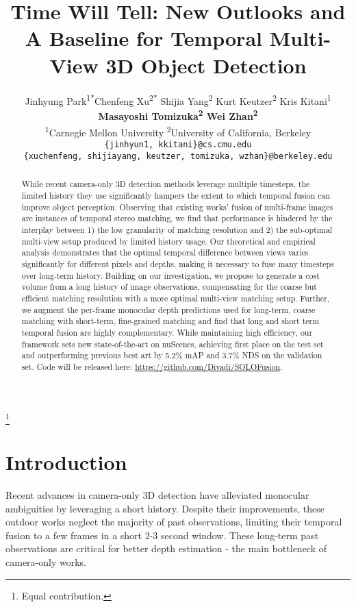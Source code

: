 \documentclass[runningheads, hyperfootnotes=false]{article}
\title{Time Will Tell: New Outlooks and A Baseline for Temporal Multi-View 3D Object Detection}
\author{Jinhyung Park\textsuperscript{1}\textsuperscript{*}\quad Chenfeng Xu\textsuperscript{2}\textsuperscript{*} \quad Shijia Yang\textsuperscript{2} \quad Kurt Keutzer\textsuperscript{2} \quad Kris Kitani\textsuperscript{1} \\ \textbf{Masayoshi Tomizuka\textsuperscript{2} \quad Wei Zhan\textsuperscript{2}}\\
\textsuperscript{1}Carnegie Mellon University \quad \textsuperscript{2}University of California, Berkeley
\\
\texttt{\{jinhyun1, kkitani\}@cs.cmu.edu} \\
\texttt{\{xuchenfeng, shijiayang, keutzer, tomizuka, wzhan\}@berkeley.edu}
}
\begin{document}
\maketitle
\let\thefootnote\relax\footnote{{Equal contribution.}}

\begin{abstract}
While recent camera-only 3D detection methods leverage multiple timesteps, the limited history they use significantly hampers the extent to which temporal fusion can improve object perception. Observing that existing works' fusion of multi-frame images are instances of temporal stereo matching, we find that performance is hindered by the interplay between 1) the low granularity of matching resolution and 2) the sub-optimal multi-view setup produced by limited history usage. Our theoretical and empirical analysis demonstrates that the optimal temporal difference between views varies significantly for different pixels and depths, making it necessary to fuse many timesteps over long-term history. Building on our investigation, we propose to generate a cost volume from a long history of image observations, compensating for the coarse but efficient matching resolution with a more optimal multi-view matching setup. Further, we augment the per-frame monocular depth predictions used for long-term, coarse matching with short-term, fine-grained matching and find that long and short term temporal fusion are highly complementary. While maintaining high efficiency, our framework sets new state-of-the-art on nuScenes, achieving first place on the test set and outperforming previous best art by 5.2\% mAP and 3.7\% NDS on the validation set. Code will be released here: \href{https://github.com/Divadi/SOLOFusion}{\color{RubineRed}https://github.com/Divadi/SOLOFusion}.
\end{abstract} \section{Introduction}
Recent advances in camera-only 3D detection have alleviated monocular ambiguities by leveraging a short history. Despite their improvements, these outdoor works neglect the majority of past observations, limiting their temporal fusion to a few frames in a short 2-3 second window. These long-term past observations are critical for better depth estimation - the main bottleneck of camera-only works.
\end{document}
